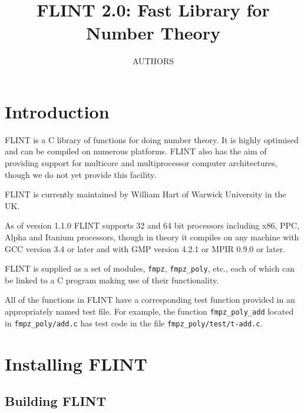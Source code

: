 \documentclass[a4paper,10pt]{book}
\title{FLINT 2.0: Fast Library for Number Theory}
\author{AUTHORS}
\newcommand{\code}{\lstinline}
\begin{document}

\frontmatter

\maketitle

\tableofcontents


\mainmatter

\chapter{Introduction}

FLINT is a C library of functions for doing number theory. It is highly 
optimised and can be compiled on numerous platforms.  FLINT also has the 
aim of providing support for multicore and multiprocessor computer 
architectures, though we do not yet provide this facility.

FLINT is currently maintained by William Hart of Warwick University in 
the UK.

As of version 1.1.0 FLINT supports 32 and 64 bit processors including 
x86, PPC, Alpha and Itanium processors, though in theory it compiles on any 
machine with GCC version 3.4 or later and with GMP version 4.2.1 or 
MPIR 0.9.0 or later.

FLINT is supplied as a set of modules, \code{fmpz}, \code{fmpz_poly}, etc., 
each of which can be linked to a C program making use of their functionality.

All of the functions in FLINT have a corresponding test function provided 
in an appropriately named test file.  For example, the function 
\code{fmpz_poly_add} located in \code{fmpz_poly/add.c} has test code in the 
file \code{fmpz_poly/test/t-add.c}.

\chapter{Installing FLINT}

\section{Building FLINT}
\end{document}
